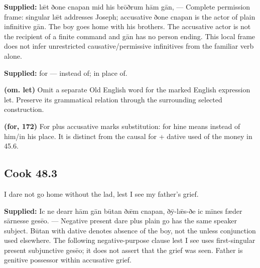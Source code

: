 \textbf{Supplied:} lǣt ðone cnapan mid his brōðrum hām gān, — Complete permission frame: singular lǣt addresses Joseph; accusative ðone cnapan is the actor of plain infinitive gān. The boy goes home with his brothers. The accusative actor is not the recipient of a finite command and gān has no person ending. This local frame does not infer unrestricted causative/\allowbreak{}permissive infinitives from the familiar verb alone.

\textbf{Supplied:} for — instead of; in place of.

\textbf{(om. let)} Omit a separate Old English word for the marked English expression let. Preserve its grammatical relation through the surrounding selected construction.

\textbf{(for, 172)} For plus accusative marks substitution: for hine means instead of him/\allowbreak{}in his place. It is distinct from the causal for + dative used of the money in 45.6.

\par\begin{minipage}{\linewidth}\raggedright
\subsection*{Cook 48.3}

I dare not go home without the lad, lest I see my father’s grief.

\end{minipage}\par\addvspace{4pt}

\textbf{Supplied:} Ic ne dearr hām gān būtan ðǣm cnapan, ðȳ-lǣs-ðe ic mīnes fæder sārnesse gesēo. — Negative present dare plus plain go has the same speaker subject. Būtan with dative denotes absence of the boy, not the unless conjunction used elsewhere. The following negative-purpose clause lest I see uses first-singular present subjunctive gesēo; it does not assert that the grief was seen. Father is genitive possessor within accusative grief.

